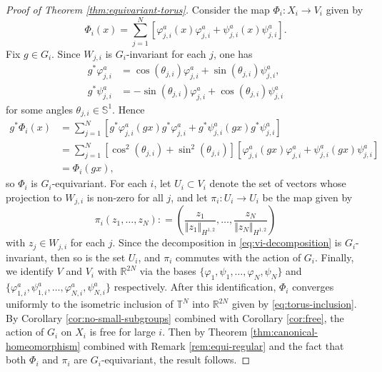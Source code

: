 \documentclass[12pt]{amsart}
\theoremstyle{definition}
\numberwithin{equation}{section}
\newcommand{\sobo}{H^{1,2}}
\begin{document}
\begin{proof}[Proof of Theorem \ref{thm:equivariant-torus}]
Consider the map $\Phi_i : X_i \to V_i$ given by 
\[   \Phi_i (x)  = \sum_{j = 1}^N [  \varphi_{j,i} ^a (x) \varphi_{j,i} ^a + \psi _{j,i}^a (x) \psi _{j,i}^a ] .   \]
Fix $g \in G_i$. Since $W_{j,i}$ is $G_i$-invariant for each $j$, one has 
\begin{align*}
g^{\ast} \varphi_{j,i}^a & = \cos ( \theta _{j,i} )\varphi_{j,i}^a + \sin  (\theta _{j,i} )\psi _{j,i}^a ,  \\
g^{\ast} \psi_{j,i}^a & = - \sin ( \theta _{j,i} )\varphi_{j,i}^a + \cos  (\theta _{j,i} )\psi _{j,i}^a 
\end{align*}
for some angles $\theta_{j,i} \in \mathbb{S}^1$. Hence
\begin{align*}
  g ^{\ast} \Phi_i (x)    & = \sum _{j =1} ^N [ g^{\ast} \varphi_{j,i} ^a (g  x)  g^{\ast}\varphi_{j,i} ^a + g^{\ast}\psi _{j,i}^a ( g x) g^{\ast} \psi _{j,i}^a ]  \\
  & = \sum _{j = 1}^N  [ \cos ^2  (\theta _{j,i} ) + \sin ^2 (\theta _{j,i} )] [  \varphi_{j,i} ^a (g  x) \varphi_{j,i} ^a + \psi _{j,i} ^a (gx) \psi _{j,i} ^a ] \\
  & = \Phi_i (gx),
\end{align*}
so $\Phi_i$ is $G_i$-equivariant. For each $i$, let $U_i \subset V_i$ denote the set of vectors whose projection to $W_{j,i}$ is non-zero for all $j$, and let $\pi_i : U_i \to U_i $ be the map given by 
\[   \pi _i (z_1, \ldots , z_N) : = \left(  \frac{z_1}{\Vert z_1 \Vert _{\sobo} } , \ldots , \frac{z_N}{\Vert z_N \Vert _{\sobo} }  \right)                \]
with $z_j \in W_{j,i} $ for each $j$. Since the decomposition in  \eqref{eq:vi-decomposition} is $G_i$-invariant, then so is the set $U_i$, and $\pi_i$ commutes with the action of $G_i$. Finally, we identify $V$ and $V_i$ with $\mathbb{R}^{2N}$ via the bases $\{ \varphi_1, \psi _1 , \ldots , \varphi_N , \psi _N \}  $ and $ \{ \varphi _{1,i}^a , \psi _{1,i}^a, \ldots , \varphi _{N,i}^a , \psi _{N,i}^a \} $ respectively. After this identification, $\Phi_i$ converges uniformly to the isometric inclusion of $\mathbb{T}^N$ into $\mathbb{R}^{2N}$ given by  \eqref{eq:torus-inclusion}. By Corollary \ref{cor:no-small-subgroups} combined with Corollary \ref{cor:free},  the action of $G_i$ on $X_i$ is free for large $i$. Then by Theorem \ref{thm:canonical-homeomorphism} combined with Remark \ref{rem:equi-regular}  and the fact that both $\Phi_i$ and $\pi_i$ are $G_i$-equivariant, the result follows.  
\end{proof}
\end{document}

